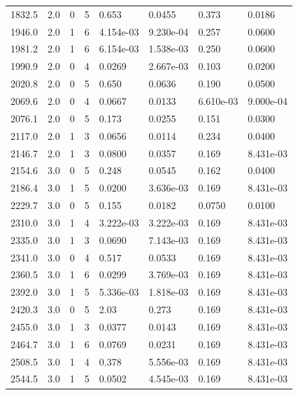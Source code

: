 \documentclass[preview]{standalone}
\begin{document}
{{{\begin{tabular}{L{1.2cm}C{1.2cm} C{0.3cm}C{0.5cm} C{1.4cm}C{1.4cm} C{1.4cm}C{1.4cm}}
  1832.5  &   2.0  & 0     &  5 &  0.653  & 0.0455  & 0.373 &  0.0186   \\ 
  1946.0  &   2.0  & 1     &  6 &  4.154e-03  & 9.230e-04  & 0.257 &  0.0600   \\ 
  1981.2  &   2.0  & 1     &  6 &  6.154e-03  & 1.538e-03  & 0.250 &  0.0600   \\ 
  1990.9  &   2.0  & 0     &  4 &  0.0269  & 2.667e-03  & 0.103 &  0.0200   \\ 
  2020.8  &   2.0  & 0     &  5 &  0.650  & 0.0636  & 0.190 &  0.0500   \\ 
  2069.6  &   2.0  & 0     &  4 &  0.0667  & 0.0133  & 6.610e-03 &  9.000e-04   \\ 
  2076.1  &   2.0  & 0     &  5 &  0.173  & 0.0255  & 0.151 &  0.0300   \\ 
  2117.0  &   2.0  & 1     &  3 &  0.0656  & 0.0114  & 0.234 &  0.0400   \\ 
  2146.7  &   2.0  & 1     &  3 &  0.0800  & 0.0357  & 0.169 &  8.431e-03   \\ 
  2154.6  &   3.0  & 0     &  5 &  0.248  & 0.0545  & 0.162 &  0.0400   \\ 
  2186.4  &   3.0  & 1     &  5 &  0.0200  & 3.636e-03  & 0.169 &  8.431e-03   \\ 
  2229.7  &   3.0  & 0     &  5 &  0.155  & 0.0182  & 0.0750 &  0.0100   \\ 
  2310.0  &   3.0  & 1     &  4 &  3.222e-03  & 3.222e-03  & 0.169 &  8.431e-03   \\ 
  2335.0  &   3.0  & 1     &  3 &  0.0690  & 7.143e-03  & 0.169 &  8.431e-03   \\ 
  2341.0  &   3.0  & 0     &  4 &  0.517  & 0.0533  & 0.169 &  8.431e-03   \\ 
  2360.5  &   3.0  & 1     &  6 &  0.0299  & 3.769e-03  & 0.169 &  8.431e-03   \\ 
  2392.0  &   3.0  & 1     &  5 &  5.336e-03  & 1.818e-03  & 0.169 &  8.431e-03   \\ 
  2420.3  &   3.0  & 0     &  5 &  2.03  & 0.273  & 0.169 &  8.431e-03   \\ 
  2455.0  &   3.0  & 1     &  3 &  0.0377  & 0.0143  & 0.169 &  8.431e-03   \\ 
  2464.7  &   3.0  & 1     &  6 &  0.0769  & 0.0231  & 0.169 &  8.431e-03   \\ 
  2508.5  &   3.0  & 1     &  4 &  0.378  & 5.556e-03  & 0.169 &  8.431e-03   \\ 
  2544.5  &   3.0  & 1     &  5 &  0.0502  & 4.545e-03  & 0.169 &  8.431e-03   \\ 

\end{tabular}}}}
\end{document}
